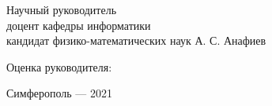 \vspace*{4\baselineskip}

\begin{adjustwidth}{2em}{0pt}
\noindent
Научный руководитель\\
доцент кафедры информатики\\
кандидат физико-математических наук
\null\hfill А. С. Анафиев
\end{adjustwidth}

\vspace*{1\baselineskip}

\begin{adjustwidth}{2em}{0pt}
\noindent
Оценка руководителя:  \underline{\hspace{7em}} \null\hfill \underline{\hspace{7em}}
\end{adjustwidth}

\vfill

\begin{center} Симферополь --- 2021 \end{center}
\thispagestyle{empty} %
\restoregeometry